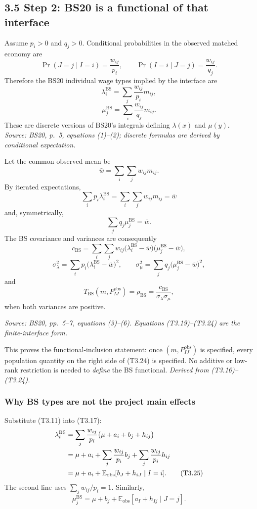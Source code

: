\documentclass[11pt]{article}
\begin{document}
\subsection{3.5 Step 2: BS20 is a functional of that interface}

Assume \(p_i>0\) and \(q_j>0\).  Conditional probabilities in the observed
matched economy are
\[
\Pr(J=j\mid I=i)
=
\frac{w_{ij}}{p_i},
\qquad
\Pr(I=i\mid J=j)
=
\frac{w_{ij}}{q_j}.
\tag{T3.16}
\]
Therefore the BS20 individual wage types implied by the interface are
\[
\lambda_i^{\mathrm{BS}}
=
\sum_j\frac{w_{ij}}{p_i}m_{ij},
\tag{T3.17}
\]
\[
\mu_j^{\mathrm{BS}}
=
\sum_i\frac{w_{ij}}{q_j}m_{ij}.
\tag{T3.18}
\]
These are discrete versions of BS20's integrals defining
\(\lambda(x)\) and \(\mu(y)\).
\textit{Source: BS20, p.\ 5, equations (1)--(2); discrete formulas are
derived by conditional expectation.}

Let the common observed mean be
\[
\bar w
=
\sum_i\sum_jw_{ij}m_{ij}.
\tag{T3.19}
\]
By iterated expectations,
\[
\sum_ip_i\lambda_i^{\mathrm{BS}}
=
\sum_i\sum_jw_{ij}m_{ij}
=
\bar w
\tag{T3.20}
\]
and, symmetrically,
\[
\sum_jq_j\mu_j^{\mathrm{BS}}=\bar w.
\tag{T3.21}
\]
The BS covariance and variances are consequently
\[
c_{\mathrm{BS}}
=
\sum_i\sum_jw_{ij}
\bigl(\lambda_i^{\mathrm{BS}}-\bar w\bigr)
\bigl(\mu_j^{\mathrm{BS}}-\bar w\bigr),
\tag{T3.22}
\]
\[
\sigma_\lambda^2
=
\sum_ip_i\bigl(\lambda_i^{\mathrm{BS}}-\bar w\bigr)^2,
\qquad
\sigma_\mu^2
=
\sum_jq_j\bigl(\mu_j^{\mathrm{BS}}-\bar w\bigr)^2,
\tag{T3.23}
\]
and
\[
T_{\mathrm{BS}}(m,P^{\mathrm{obs}}_{IJ})
=
\rho_{\mathrm{BS}}
=
\frac{c_{\mathrm{BS}}}{\sigma_\lambda\sigma_\mu},
\tag{T3.24}
\]
when both variances are positive.

\textit{Source: BS20, pp.\ 5--7, equations (3)--(6).  Equations
(T3.19)--(T3.24) are the finite-interface form.}

This proves the functional-inclusion statement: once
\((m,P^{\mathrm{obs}}_{IJ})\) is specified, every population quantity on the
right side of (T3.24) is specified.  No additive or low-rank restriction is
needed to \emph{define} the BS functional.
\textit{Derived from (T3.16)--(T3.24).}

\subsubsection{Why BS types are not the project main effects}

Substitute (T3.11) into (T3.17):
\begin{align}
\lambda_i^{\mathrm{BS}}
&=
\sum_j\frac{w_{ij}}{p_i}
\bigl(\mu+a_i+b_j+h_{ij}\bigr) \notag\\
&=
\mu+a_i
+\sum_j\frac{w_{ij}}{p_i}b_j
+\sum_j\frac{w_{ij}}{p_i}h_{ij} \notag\\
&=
\mu+a_i
+\mathbb E_{\mathrm{obs}}[b_J+h_{iJ}\mid I=i].
\tag{T3.25}
\end{align}
The second line uses
\(\sum_jw_{ij}/p_i=1\).  Similarly,
\[
\mu_j^{\mathrm{BS}}
=
\mu+b_j
+\mathbb E_{\mathrm{obs}}[a_I+h_{Ij}\mid J=j].
\tag{T3.26}
\]
\end{document}
